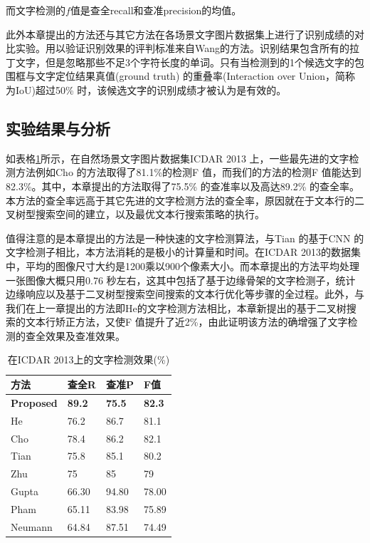         而文字检测的$f$值是查全recall和查准precision的均值。

        此外本章提出的方法还与其它方法在各场景文字图片数据集上进行了识别成绩的对比实验。用以验证识别效果的评判标准来自Wang\cite{Wang2012End}的方法。识别结果包含所有的拉丁文字，但是忽略那些不足3个字符长度的单词。只有当检测到的1个候选文字的包围框与文字定位结果真值(ground truth) 的重叠率(Interaction over Union，简称为IoU)超过50\% 时，该候选文字的识别成绩才被认为是有效的。

        \subsection{实验结果与分析}

        如表格\ref{tab.c4_icdar13}所示，在自然场景文字图片数据集ICDAR 2013 上，一些最先进的文字检测方法例如Cho\cite{Cho2016Canny} 的方法取得了81.1\%的检测F 值，而我们的方法的检测F 值能达到82.3\%。其中，本章提出的方法取得了75.5\% 的查准率以及高达89.2\% 的查全率。本方法的查全率远高于其它先进的文字检测方法的查全率，原因就在于文本行的二叉树型搜索空间的建立，以及最优文本行搜索策略的执行。

        值得注意的是本章提出的方法是一种快速的文字检测算法，与Tian\cite{Tian2016Text} 的基于CNN 的文字检测子相比，本方法消耗的是极小的计算量和时间。在ICDAR 2013的数据集中，平均的图像尺寸大约是1200乘以900个像素大小。而本章提出的方法平均处理一张图像大概只用0.76 秒左右，这其中包括了基于边缘骨架的文字检测子，统计边缘响应以及基于二叉树型搜索空间搜索的文本行优化等步骤的全过程。此外，与我们在上一章提出的方法即He\cite{He2017scene}的文字检测方法相比，本章新提出的基于二叉树搜索的文本行矫正方法，又使F 值提升了近2\%，由此证明该方法的确增强了文字检测的查全效果及查准效果。

        \begin{table}[!h]
        \centering
        \caption{在ICDAR 2013上的文字检测效果(\%)}
        \begin{tabular}{p{}|p{} p{} p{}}
        \hline
        方法 & 查全R & 查准P & F值 \\
        \hline
        \textbf{Proposed} & \textbf{89.2} & \textbf{75.5} & \textbf{82.3}\\
        He\cite{He2017scene} & 76.2 & 86.7 & 81.1 \\
        Cho\cite{Cho2016Canny} & 78.4 & 86.2 & 82.1 \\
        Tian\cite{Tian2016Text} & 75.8 & 85.1 & 80.2 \\
        Zhu\cite{Zhu2016Text} & 75 & 85 & 79 \\
        Gupta\cite{Gupta2016Synthetic} & 66.30 & 94.80 & 78.00 \\
        Pham\cite{Pham2016Robust} & 65.11 & 83.98 & 75.89 \\
        Neumann\cite{Neumann2012Real} & 64.84 & 87.51 & 74.49 \\
        \hline
        \end{tabular}
        \label{tab.c4_icdar13}
        \end{table}

